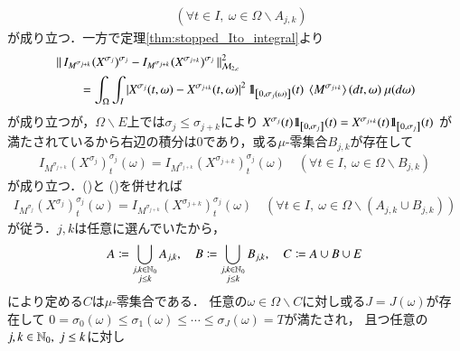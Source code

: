\begin{prf}
\begin{description}
\begin{align}
					\quad (\forall t \in I,\ \omega \in \Omega \backslash A_{j,k})
					\label{eq:thm_Ito_integral_on_M_c_loc_and_left_cont_locally_bounded_4}
				\end{align}
				が成り立つ．一方で定理\ref{thm:stopped_Ito_integral}より
				\begin{align}
					&\Norm{I_{M^{\sigma_{j+k}}}(X^{\sigma_j})^{\sigma_j} - I_{M^{\sigma_{j+k}}}(X^{\sigma_{j+k}})^{\sigma_j}}{\mathcal{M}_{2,c}}^2 \\
					&\qquad = \int_\Omega \int_I \left| X^{\sigma_j}(t,\omega) - X^{\sigma_{j+k}}(t,\omega) \right|^2 
						\defunc_{\left[0,\sigma_j(\omega)\right]}(t)\ \inprod<M^{\sigma_{j+k}}>(dt,\omega)\ \mu(d\omega)
				\end{align}
				が成り立つが，$\Omega \backslash E$上では$\sigma_j \leq \sigma_{j+k}$により
				$X^{\sigma_j}(t) \mbox{1}\hspace{-0.25em}\mbox{l}_{\left[0,\sigma_j\right]}(t) = X^{\sigma_{j+k}}(t) \mbox{1}\hspace{-0.25em}\mbox{l}_{\left[0,\sigma_j\right]}(t)$
				が満たされているから右辺の積分は0であり，或る$\mu$-零集合$B_{j,k}$が存在して
				\begin{align}
					I_{M^{\sigma_{j+k}}}(X^{\sigma_j})^{\sigma_j}_t(\omega) = I_{M^{\sigma_{j+k}}}(X^{\sigma_{j+k}})^{\sigma_j}_t(\omega)
					\quad (\forall t \in I,\ \omega \in \Omega \backslash B_{j,k})
					\label{eq:thm_Ito_integral_on_M_c_loc_and_left_cont_locally_bounded_5}
				\end{align}
				が成り立つ．()と
				()を併せれば
				\begin{align}
					I_{M^{\sigma_j}}(X^{\sigma_j})^{\sigma_j}_t(\omega) = I_{M^{\sigma_{j+k}}}(X^{\sigma_{j+k}})^{\sigma_j}_t(\omega)
					\quad \left( \forall t \in I,\ \omega \in \Omega \backslash \left( A_{j,k} \cup B_{j,k} \right) \right)
				\end{align}
				が従う．$j,k$は任意に選んでいたから，
				\begin{align}
					A \coloneqq \bigcup_{\substack{j,k \in \mathbb{N}_0\\j \leq k}} A_{j,k},
					\quad B \coloneqq \bigcup_{\substack{j,k \in \mathbb{N}_0\\j \leq k}} B_{j,k},
					\quad C \coloneqq A \cup B \cup E
				\end{align}
				により定める$C$は$\mu$-零集合である．
				任意の$\omega \in \Omega \backslash C$に対し或る$J = J(\omega)$が存在して
				$0 = \sigma_0(\omega) \leq \sigma_1(\omega) \leq \cdots \leq \sigma_J(\omega) = T$が満たされ，
				且つ任意の$j,k \in \mathbb{N}_0,\ j \leq k$に対し

\end{description}
\end{prf}
